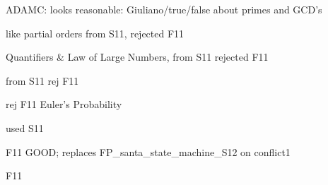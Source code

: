 \documentclass[quiz]{mcs}
\begin{document}
\final


\examspace 
\begin{editingnotes}
ADAMC: looks reasonable: Giuliano/true/false about primes and GCD's
\end{editingnotes}

\examspace 
\begin{editingnotes}like partial orders from S11, rejected F11\end{editingnotes}

\examspace  
\begin{editingnotes}
Quantifiers \& Law of Large Numbers, from S11 rejected F11
\end{editingnotes}

\examspace
\begin{editingnotes} from S11 rej F11\end{editingnotes}

\examspace  
\begin{editingnotes}rej F11 Euler's Probability\end{editingnotes}

\examspace 
\begin{editingnotes}used S11\end{editingnotes}

\examspace 
\begin{editingnotes}
F11 GOOD; replaces FP_santa_state_machine_S12 on conflict1
\end{editingnotes}

\examspace
\begin{editingnotes}F11\end{editingnotes}
\end{document}
